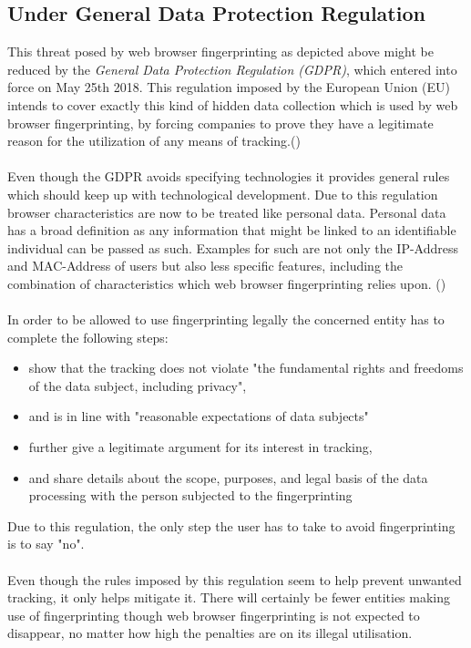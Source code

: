 \subsection{Under General Data Protection Regulation}
This threat posed by web browser fingerprinting as depicted above might be reduced by the \textit{General Data Protection Regulation (GDPR)}, which entered into force on May 25th 2018. This regulation imposed by the European Union (EU) intends to cover exactly this kind of hidden data collection which is used by web browser fingerprinting, by forcing companies to prove they have a legitimate reason for the utilization of any means of tracking.(\textcite{miele18})\\\\
Even though the GDPR avoids specifying technologies it provides general rules which should keep up with technological development. Due to this regulation browser characteristics are now to be treated like personal data. Personal data has a broad definition as any information that might be linked to an identifiable individual can be passed as such. Examples for such are not only the IP-Address and MAC-Address of users but also less specific features, including the combination of characteristics which web browser fingerprinting relies upon. (\textcite{miele18})\\\\
In order to be allowed to use fingerprinting legally the concerned entity has to complete the following steps:\\
\begin{itemize}
	\item show that the tracking does not violate "the fundamental rights and freedoms of the data subject, including privacy", 
	\item and is in line with "reasonable expectations of data subjects"
	\item further give a legitimate argument for its interest in tracking,
	\item and share details about the scope, purposes, and legal basis of the data processing with the person subjected to the fingerprinting\\
\end{itemize}
Due to this regulation, the only step the user has to take to avoid fingerprinting is to say "no".\\\\
Even though the rules imposed by this regulation seem to help prevent unwanted tracking, it only helps mitigate it. There will certainly be fewer entities making use of fingerprinting though web browser fingerprinting is not expected to disappear, no matter how high the penalties are on its illegal utilisation.\\
